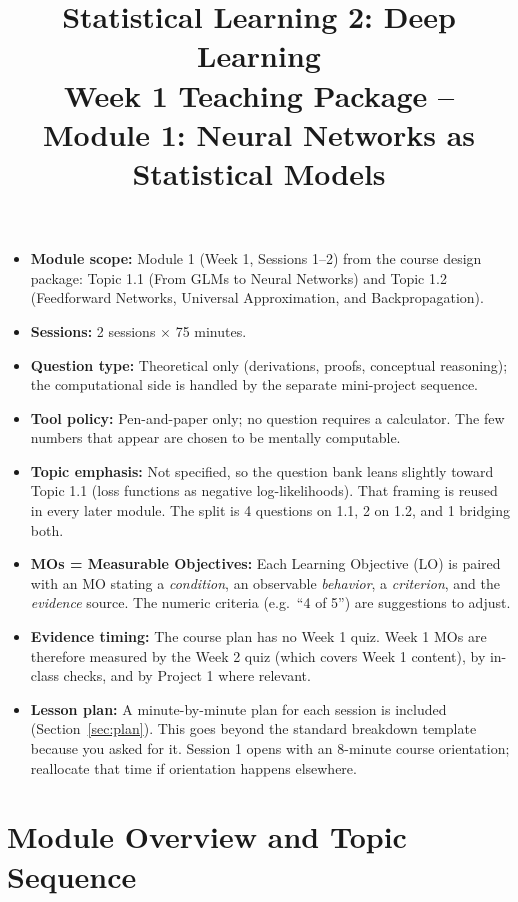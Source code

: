 \documentclass[11pt]{article}
\title{Statistical Learning 2: Deep Learning\\[4pt]
\large Week 1 Teaching Package -- Module 1: Neural Networks as Statistical Models}
\author{}
\date{}
\begin{document}
\maketitle

\begin{assumptions}
\begin{itemize}
  \item \textbf{Module scope:} Module 1 (Week 1, Sessions 1--2) from the course design package: Topic 1.1 (From GLMs to Neural Networks) and Topic 1.2 (Feedforward Networks, Universal Approximation, and Backpropagation).
  \item \textbf{Sessions:} 2 sessions $\times$ 75 minutes.
  \item \textbf{Question type:} Theoretical only (derivations, proofs, conceptual reasoning); the computational side is handled by the separate mini-project sequence.
  \item \textbf{Tool policy:} Pen-and-paper only; no question requires a calculator. The few numbers that appear are chosen to be mentally computable.
  \item \textbf{Topic emphasis:} Not specified, so the question bank leans slightly toward Topic 1.1 (loss functions as negative log-likelihoods). That framing is reused in every later module. The split is 4 questions on 1.1, 2 on 1.2, and 1 bridging both.
  \item \textbf{MOs = Measurable Objectives:} Each Learning Objective (LO) is paired with an MO stating a \emph{condition}, an observable \emph{behavior}, a \emph{criterion}, and the \emph{evidence} source. The numeric criteria (e.g.\ ``4 of 5'') are suggestions to adjust.
  \item \textbf{Evidence timing:} The course plan has no Week 1 quiz. Week 1 MOs are therefore measured by the Week 2 quiz (which covers Week 1 content), by in-class checks, and by Project 1 where relevant.
  \item \textbf{Lesson plan:} A minute-by-minute plan for each session is included (Section~\ref{sec:plan}). This goes beyond the standard breakdown template because you asked for it. Session 1 opens with an 8-minute course orientation; reallocate that time if orientation happens elsewhere.
\end{itemize}
\end{assumptions}

\section{Module Overview and Topic Sequence}
\end{document}

